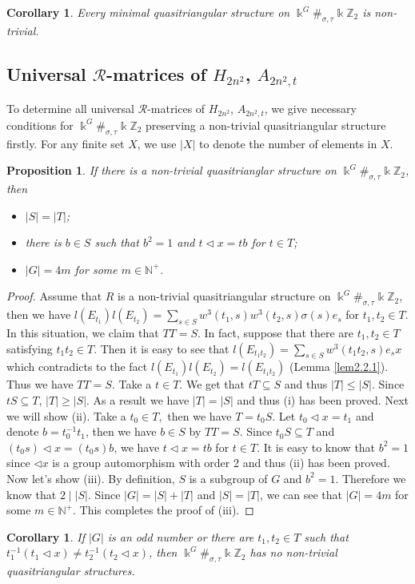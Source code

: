 \documentclass[a4paper,11pt]{amsart}
\numberwithin{equation}{section}
\newtheorem{proposition}[theorem]{Proposition}
\newtheorem{corollary}[theorem]{Corollary}
\begin{document}
\begin{corollary}\label{coro2.2.1}
Every minimal quasitriangular structure on $\Bbbk^G\#_{\sigma,\tau}\Bbbk \mathbb{Z}_{2}$ is non-trivial.
\end{corollary}

\subsection{Universal $\mathcal{R}$-matrices of $H_{2n^2}$, $A_{2n^2,t}$}
To determine all universal $\mathcal{R}$-matrices of $H_{2n^2}$, $A_{2n^2,t}$, we give necessary conditions for $\Bbbk^G\#_{\sigma,\tau}\Bbbk \mathbb{Z}_{2}$ preserving a non-trivial quasitriangular structure firstly. For any finite set $X$, we use $|X|$ to denote the number of elements in $X$.
\begin{proposition}\label{pro2.3.1}
If there is a non-trivial quasitrianglar structure on $\Bbbk^G\#_{\sigma,\tau}\Bbbk \mathbb{Z}_{2}$, then
\begin{itemize}
  \item[(i)] $|S|=|T|$;
  \item[(ii)]  there is $b\in S$ such that $b^2=1$ and $t\triangleleft x=tb$ for $t\in T$;
  \item[(iii)] $|G|=4m$ for some $m\in \mathbb{N^+}$.
\end{itemize}
\end{proposition}

\begin{proof}
Assume that $R$ is a non-trivial quasitriangular structure on $\Bbbk^G\#_{\sigma,\tau}\Bbbk \mathbb{Z}_{2}$, then we have $l(E_{t_1})l(E_{t_2})=\sum_{s\in S}w^3(t_1,s)w^3(t_2,s)\sigma(s)e_s$ for $t_1,t_2 \in T$. In this situation, we claim that $TT=S$. In fact, suppose that there are $t_1,t_2 \in T$ satisfying $t_1t_2\in T$. Then it is easy to see that $l(E_{t_1t_2})=\sum_{s \in S}w^3(t_1t_2,s)e_{s}x$ which contradicts to the fact $l(E_{t_1})l(E_{t_2})=l(E_{t_1t_2})$ (Lemma \ref{lem2.2.1}).  Thus we have $TT=S$. Take a $t\in T$. We get that $tT\subseteq S$ and thus $|T|\leq |S|$. Since $tS\subseteq T$, $|T|\geq |S|$.
As a result we have $|T|=|S|$ and thus (i) has been proved. Next we will show (ii). Take a $t_0\in T,$ then we have $T=t_0S$. Let $t_0 \triangleleft x=t_1$ and denote $b=t_0^{-1}t_1$, then we have $b\in S$ by $TT=S$. Since $t_0S\subseteq T$ and $(t_0s)\triangleleft x=(t_0s)b$, we have $t\triangleleft x=tb$ for $t\in T$. It is easy to know that $b^2=1$ since $\triangleleft x$ is a group automorphism with order 2 and thus (ii) has been proved. Now let's show (iii).  By definition, $S$ is a subgroup of $G$ and $b^2=1$. Therefore we know that $2\;|\;|S|$. Since $|G|=|S|+|T|$ and $|S|=|T|$, we can see that $|G|=4m$ for some $m\in \mathbb{N^+}$. This completes the proof of (iii).
\end{proof}
\begin{corollary} \label{coro2.3.1}
If $|G|$ is an odd number or there are $t_1,t_2\in T$ such that $t_1^{-1}(t_1\triangleleft x)\neq t_2^{-1}(t_2\triangleleft x)$, then $\Bbbk^G\#_{\sigma,\tau}\Bbbk \mathbb{Z}_{2}$ has no non-trivial quasitriangular structures.
\end{corollary}
\end{document}
